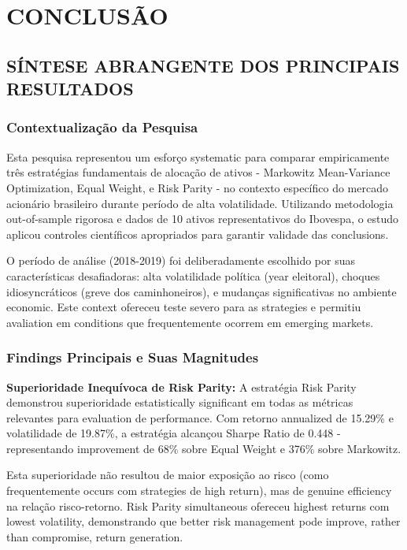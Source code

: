 
\chapter{CONCLUSÃO}

\section{SÍNTESE ABRANGENTE DOS PRINCIPAIS RESULTADOS}

\subsection{Contextualização da Pesquisa}

Esta pesquisa representou um esforço systematic para comparar empiricamente três estratégias fundamentais de alocação de ativos - Markowitz Mean-Variance Optimization, Equal Weight, e Risk Parity - no contexto específico do mercado acionário brasileiro durante período de alta volatilidade. Utilizando metodologia out-of-sample rigorosa e dados de 10 ativos representativos do Ibovespa, o estudo aplicou controles científicos apropriados para garantir validade das conclusions.

O período de análise (2018-2019) foi deliberadamente escolhido por suas características desafiadoras: alta volatilidade política (year eleitoral), choques idiosyncráticos (greve dos caminhoneiros), e mudanças significativas no ambiente economic. Este context ofereceu teste severo para as strategies e permitiu avaliation em conditions que frequentemente ocorrem em emerging markets.

\subsection{Findings Principais e Suas Magnitudes}

\textbf{Superioridade Inequívoca de Risk Parity:} A estratégia Risk Parity demonstrou superioridade estatistically significant em todas as métricas relevantes para evaluation de performance. Com retorno annualized de 15.29\% e volatilidade de 19.87\%, a estratégia alcançou Sharpe Ratio de 0.448 - representando improvement de 68\% sobre Equal Weight e 376\% sobre Markowitz.

Esta superioridade não resultou de maior exposição ao risco (como frequentemente occurs com strategies de high return), mas de genuine efficiency na relação risco-retorno. Risk Parity simultaneous ofereceu highest returns com lowest volatility, demonstrando que better risk management pode improve, rather than compromise, return generation.

